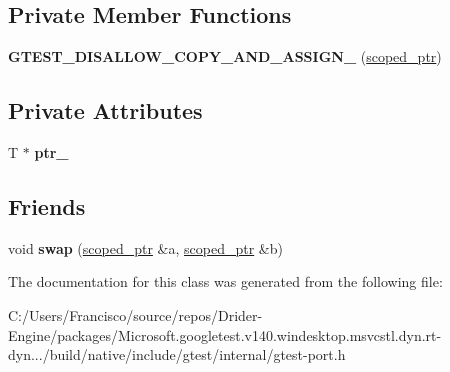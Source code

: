 \subsection*{Private Member Functions}
\begin{DoxyCompactItemize}
\item 
\mbox{\label{classtesting_1_1internal_1_1scoped__ptr_aa905e98e04e868208e9fb850b93d58f4}} 
{\bfseries G\+T\+E\+S\+T\+\_\+\+D\+I\+S\+A\+L\+L\+O\+W\+\_\+\+C\+O\+P\+Y\+\_\+\+A\+N\+D\+\_\+\+A\+S\+S\+I\+G\+N\+\_\+} (\hyperlink{classtesting_1_1internal_1_1scoped__ptr}{scoped\+\_\+ptr})
\end{DoxyCompactItemize}
\subsection*{Private Attributes}
\begin{DoxyCompactItemize}
\item 
\mbox{\label{classtesting_1_1internal_1_1scoped__ptr_ab69d9f1f216ae91f8b8abca63e797397}} 
T $\ast$ {\bfseries ptr\+\_\+}
\end{DoxyCompactItemize}
\subsection*{Friends}
\begin{DoxyCompactItemize}
\item 
\mbox{\label{classtesting_1_1internal_1_1scoped__ptr_a01bc0441e6a3ebf26807ac523392ca86}} 
void {\bfseries swap} (\hyperlink{classtesting_1_1internal_1_1scoped__ptr}{scoped\+\_\+ptr} \&a, \hyperlink{classtesting_1_1internal_1_1scoped__ptr}{scoped\+\_\+ptr} \&b)
\end{DoxyCompactItemize}


The documentation for this class was generated from the following file\+:\begin{DoxyCompactItemize}
\item 
C\+:/\+Users/\+Francisco/source/repos/\+Drider-\/\+Engine/packages/\+Microsoft.\+googletest.\+v140.\+windesktop.\+msvcstl.\+dyn.\+rt-\/dyn.../build/native/include/gtest/internal/gtest-\/port.\+h\end{DoxyCompactItemize}
